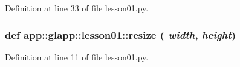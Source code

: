 Definition at line 33 of file lesson01.py.
\subsubsection{\setlength{\rightskip}{0pt plus 5cm}def app::glapp::lesson01::resize ( {\em width},  {\em height})}\label{namespaceapp_1_1glapp_1_1lesson01_20ac7813dba0e0035ec2afb1cdba3dc7}




Definition at line 11 of file lesson01.py.